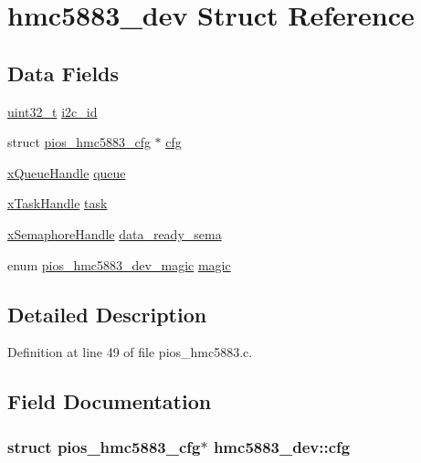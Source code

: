 \hypertarget{structhmc5883__dev}{\section{hmc5883\-\_\-dev Struct Reference}
\label{structhmc5883__dev}
}
\subsection*{Data Fields}
\begin{DoxyCompactItemize}
\item 
\hyperlink{stdint_8h_a435d1572bf3f880d55459d9805097f62}{uint32\-\_\-t} \hyperlink{structhmc5883__dev_aebf7ac3174874aa4322f25c242c96cbc}{i2c\-\_\-id}
\item 
struct \hyperlink{structpios__hmc5883__cfg}{pios\-\_\-hmc5883\-\_\-cfg} $\ast$ \hyperlink{structhmc5883__dev_a65908df946905ff14183243b01690ecf}{cfg}
\item 
\hyperlink{_common_2_libraries_2_free_r_t_o_s_2_source_2include_2queue_8h_a229037f755b756156e34a440ce134b8b}{x\-Queue\-Handle} \hyperlink{structhmc5883__dev_adc55a1a3ea4c43196bf7c411309485ac}{queue}
\item 
\hyperlink{_common_2_libraries_2_free_r_t_o_s_2_source_2include_2task_8h_a271ae40d5db07d928a113766505a0965}{x\-Task\-Handle} \hyperlink{structhmc5883__dev_a1e212c4df92f634246a79adcba32a4cf}{task}
\item 
\hyperlink{_common_2_libraries_2_free_r_t_o_s_2_source_2include_2semphr_8h_aa91aa1b6835a184838f9ccf138a6ad10}{x\-Semaphore\-Handle} \hyperlink{structhmc5883__dev_a391988bf3eb9db5a73d9c8db759b1cff}{data\-\_\-ready\-\_\-sema}
\item 
enum \hyperlink{group___p_i_o_s___h_m_c5883_ga694f4a1224c19ea7205e8865132bc4c8}{pios\-\_\-hmc5883\-\_\-dev\-\_\-magic} \hyperlink{structhmc5883__dev_a035551dfd62138e07853dd71dfc252c4}{magic}
\end{DoxyCompactItemize}


\subsection{Detailed Description}


Definition at line 49 of file pios\-\_\-hmc5883.\-c.



\subsection{Field Documentation}
\hypertarget{structhmc5883__dev_a65908df946905ff14183243b01690ecf}{
\subsubsection[{cfg}]{\setlength{\rightskip}{0pt plus 5cm}struct {\bf pios\-\_\-hmc5883\-\_\-cfg}$\ast$ hmc5883\-\_\-dev\-::cfg}}\label{structhmc5883__dev_a65908df946905ff14183243b01690ecf}


